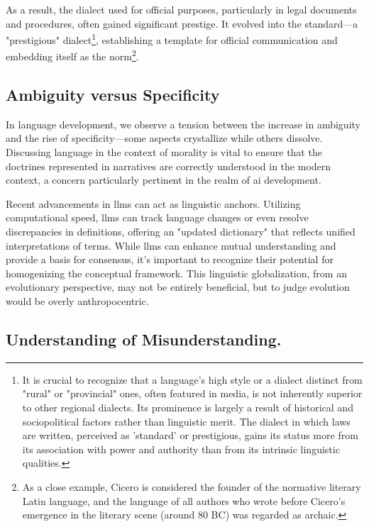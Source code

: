 \documentclass[11pt,a4]{article}
\begin{document}
    As a result, the dialect used for official purposes, particularly in legal documents
    and procedures, often gained significant prestige. It evolved into the
    standard---a "prestigious" dialect\footnote{It is crucial to recognize that a
    language's high style or a dialect distinct from "rural" or "provincial" ones,
    often featured in media, is not inherently superior to other regional dialects.
    Its prominence is largely a result of historical and sociopolitical factors rather
    than linguistic merit. The dialect in which laws are written, perceived as 'standard'
    or prestigious, gains its status more from its association with power and authority
    than from its intrinsic linguistic qualities.}, establishing a template for official
    communication and embedding itself as the norm\footnote{As a close example,
    Cicero is considered the founder of the normative literary Latin language, and the
    language of all authors who wrote before Cicero's emergence in the literary
    scene (around 80 BC) was regarded as archaic.
    }.


\subsection{Ambiguity versus Specificity}

    In language development, we observe a tension between the increase in ambiguity and the rise of
    specificity---some aspects crystallize while others dissolve. Discussing language in the context
    of morality is vital to ensure that the doctrines represented in narratives are correctly understood
    in the modern context, a concern particularly pertinent in the realm of \acrshort{ai} development.

    Recent advancements in \glspl{llm} can act as linguistic anchors.
    Utilizing computational speed, \glspl{llm}  can track language changes or even resolve discrepancies
    in definitions, offering an "updated dictionary" that reflects unified interpretations of terms.
     While \glspl{llm}  can enhance mutual understanding and provide a basis for consensus,
     it's important to recognize their potential for homogenizing the conceptual framework.
     This linguistic globalization, from an evolutionary perspective, may not be entirely beneficial,
     but to judge evolution would be overly anthropocentric.


 \subsection{Understanding of Misunderstanding.}
\end{document}

